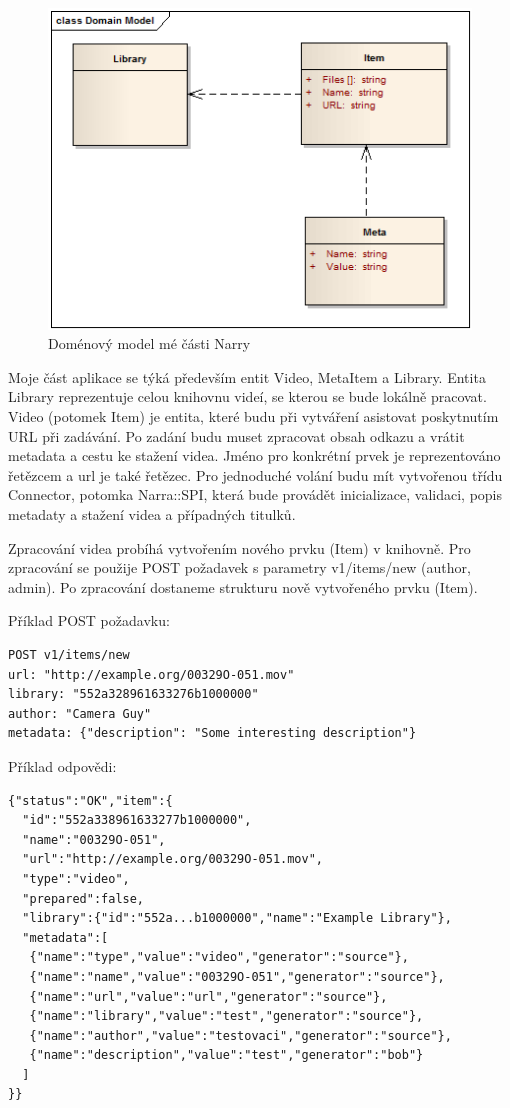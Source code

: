 \begin{figure}[H]
\includegraphics[width=1\textwidth]{./obrazova_priloha/domain_my.png}
\caption{Doménový model mé části Narry}
\end{figure}
\par Moje část aplikace se týká především entit Video, MetaItem a Library. Entita Library reprezentuje celou knihovnu videí, se kterou se bude lokálně pracovat. Video (potomek Item) je entita, které budu při vytváření asistovat poskytnutím URL při zadávání. Po zadání budu muset zpracovat obsah odkazu a vrátit metadata a cestu ke stažení videa. Jméno pro konkrétní prvek je reprezentováno řetězcem a url je také řetězec. Pro jednoduché volání budu mít vytvořenou třídu Connector, potomka Narra::SPI, která bude provádět inicializace, validaci, popis metadaty a stažení videa a případných titulků.
\par Zpracování videa probíhá vytvořením nového prvku (Item) v knihovně. Pro zpracování se použije POST požadavek s parametry v1/items/new (author, admin). Po zpracování dostaneme strukturu nově vytvořeného prvku (Item).
\par Příklad POST požadavku\cite{narra_en}:
\begin{verbatim} 
POST v1/items/new
url: "http://example.org/00329O-051.mov"
library: "552a328961633276b1000000" 
author: "Camera Guy"
metadata: {"description": "Some interesting description"}
\end{verbatim}
\hfill
\par Příklad odpovědi:
\begin{verbatim}
{"status":"OK","item":{
  "id":"552a338961633277b1000000",
  "name":"00329O-051",
  "url":"http://example.org/00329O-051.mov",
  "type":"video",
  "prepared":false,
  "library":{"id":"552a...b1000000","name":"Example Library"},
  "metadata":[
   {"name":"type","value":"video","generator":"source"},
   {"name":"name","value":"00329O-051","generator":"source"},
   {"name":"url","value":"url","generator":"source"},
   {"name":"library","value":"test","generator":"source"},
   {"name":"author","value":"testovaci","generator":"source"},
   {"name":"description","value":"test","generator":"bob"}
  ]
}}
\end{verbatim}
